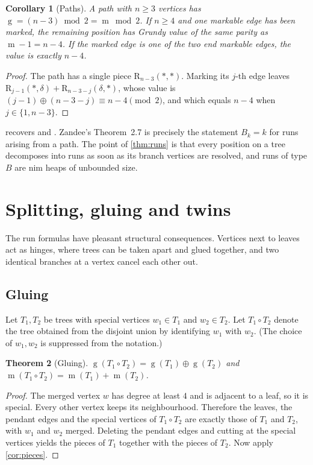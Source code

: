 \documentclass[11pt]{amsart}
\newtheorem{theorem}{Theorem}[section]
\newtheorem{corollary}[theorem]{Corollary}
\theoremstyle{definition}
\theoremstyle{remark}
\newcommand{\gv}{\operatorname{g}}           %
\newcommand{\m}{\operatorname{m}}
\newcommand{\R}{\mathrm{R}}
\newcommand{\free}{\ast}
\begin{document}
\begin{corollary}[Paths]\label{cor:path}
A path with $n\ge3$ vertices has $\gv=(n-3)\bmod 2=\m\bmod2$. If $n\ge4$ and one markable edge has been marked, the remaining position has Grundy value of the same parity as $\m-1=n-4$. If the marked edge is one of the two end markable edges, the value is exactly $n-4$.
\end{corollary}

\begin{proof}
The path has a single piece $\R_{n-3}(\free,\free)$. Marking its $j$-th edge leaves $\R_{j-1}(\free,\delta)+\R_{n-3-j}(\delta,\free)$, whose value is $(j-1)\oplus(n-3-j)\equiv n-4\pmod2$, and which equals $n-4$ when $j\in\{1,n-3\}$.
\end{proof}

 recovers \cite[Theorem~5.1]{Lin2021} and \cite[Theorem~2.7, Corollary~2.8]{Zandee2022}. Zandee's Theorem~2.7 is precisely the statement $B_k=k$ for runs arising from a path. The point of \cref{thm:runs} is that every position on a tree decomposes into runs as soon as its branch vertices are resolved, and runs of type $B$ are nim heaps of unbounded size.

\section{Splitting, gluing and twins}\label{sec:consequences}

The run formulas have pleasant structural consequences. Vertices next to leaves act as hinges, where trees can be taken apart and glued together, and two identical branches at a vertex cancel each other out.

\subsection{Gluing}
Let $T_1,T_2$ be trees with special vertices $w_1\in T_1$ and $w_2\in T_2$. Let $T_1\circ T_2$ denote the tree obtained from the disjoint union by identifying $w_1$ with $w_2$. (The choice of $w_1,w_2$ is suppressed from the notation.)

\begin{theorem}[Gluing]\label{thm:glue}
$\gv(T_1\circ T_2)=\gv(T_1)\oplus\gv(T_2)$ and $\m(T_1\circ T_2)=\m(T_1)+\m(T_2)$.
\end{theorem}

\begin{proof}
The merged vertex $w$ has degree at least $4$ and is adjacent to a leaf, so it is special. Every other vertex keeps its neighbourhood. Therefore the leaves, the pendant edges and the special vertices of $T_1\circ T_2$ are exactly those of $T_1$ and $T_2$, with $w_1$ and $w_2$ merged. Deleting the pendant edges and cutting at the special vertices yields the pieces of $T_1$ together with the pieces of $T_2$. Now apply \cref{cor:pieces}.
\end{proof}
\end{document}

